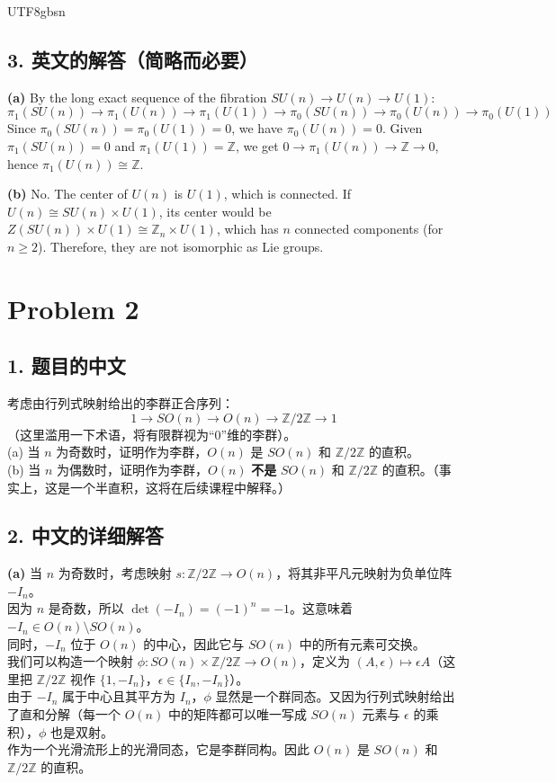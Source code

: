 \documentclass{article}
\begin{document}
\begin{CJK*}{UTF8}{gbsn}
\subsection*{3. 英文的解答（简略而必要）}
\textbf{(a)} By the long exact sequence of the fibration $SU(n) \to U(n) \to U(1)$:
$$ \pi_1(SU(n)) \to \pi_1(U(n)) \to \pi_1(U(1)) \to \pi_0(SU(n)) \to \pi_0(U(n)) \to \pi_0(U(1)) $$
Since $\pi_0(SU(n)) = \pi_0(U(1)) = 0$, we have $\pi_0(U(n)) = 0$.
Given $\pi_1(SU(n)) = 0$ and $\pi_1(U(1)) = \mathbb{Z}$, we get $0 \to \pi_1(U(n)) \to \mathbb{Z} \to 0$, hence $\pi_1(U(n)) \cong \mathbb{Z}$.

\textbf{(b)} No. The center of $U(n)$ is $U(1)$, which is connected. If $U(n) \cong SU(n) \times U(1)$, its center would be $Z(SU(n)) \times U(1) \cong \mathbb{Z}_n \times U(1)$, which has $n$ connected components (for $n \ge 2$). Therefore, they are not isomorphic as Lie groups.

\vspace{1em}

\section*{Problem 2}

\subsection*{1. 题目的中文}
考虑由行列式映射给出的李群正合序列：
$$ 1 \to SO(n) \to O(n) \to \mathbb{Z}/2\mathbb{Z} \to 1 $$
（这里滥用一下术语，将有限群视为“0”维的李群）。\\
(a) 当 $n$ 为奇数时，证明作为李群，$O(n)$ 是 $SO(n)$ 和 $\mathbb{Z}/2\mathbb{Z}$ 的直积。\\
(b) 当 $n$ 为偶数时，证明作为李群，$O(n)$ \textbf{不是} $SO(n)$ 和 $\mathbb{Z}/2\mathbb{Z}$ 的直积。（事实上，这是一个半直积，这将在后续课程中解释。）

\subsection*{2. 中文的详细解答}
\textbf{(a)} 当 $n$ 为奇数时，考虑映射 $s: \mathbb{Z}/2\mathbb{Z} \to O(n)$，将其非平凡元映射为负单位阵 $-I_n$。\\
因为 $n$ 是奇数，所以 $\det(-I_n) = (-1)^n = -1$。这意味着 $-I_n \in O(n) \setminus SO(n)$。\\
同时，$-I_n$ 位于 $O(n)$ 的中心，因此它与 $SO(n)$ 中的所有元素可交换。\\
我们可以构造一个映射 $\phi: SO(n) \times \mathbb{Z}/2\mathbb{Z} \to O(n)$，定义为 $(A, \epsilon) \mapsto \epsilon A$（这里把 $\mathbb{Z}/2\mathbb{Z}$ 视作 $\{1, -I_n\}$，$\epsilon \in \{I_n, -I_n\}$）。\\
由于 $-I_n$ 属于中心且其平方为 $I_n$，$\phi$ 显然是一个群同态。又因为行列式映射给出了直和分解（每一个 $O(n)$ 中的矩阵都可以唯一写成 $SO(n)$ 元素与 $\epsilon$ 的乘积），$\phi$ 也是双射。\\
作为一个光滑流形上的光滑同态，它是李群同构。因此 $O(n)$ 是 $SO(n)$ 和 $\mathbb{Z}/2\mathbb{Z}$ 的直积。


\end{CJK*}
\end{document}
